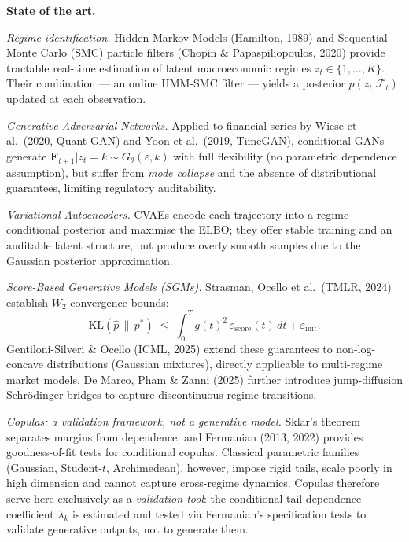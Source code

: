 \documentclass[11pt,a4paper]{article}
\begin{document}
\noindent\textbf{State of the art.}

\textit{Regime identification.}
Hidden Markov Models (Hamilton, 1989) and Sequential Monte Carlo (SMC) particle
filters (Chopin \& Papaspiliopoulos, 2020) provide tractable real-time estimation
of latent macroeconomic regimes $z_t \in \{1,\ldots,K\}$. Their combination ---
an online HMM-SMC filter --- yields a posterior $p(z_t|\mathcal{F}_t)$ updated at
each observation.

\textit{Generative Adversarial Networks.}
Applied to financial series by Wiese et al.\ (2020, Quant-GAN) and Yoon et al.\
(2019, TimeGAN), conditional GANs generate
$\mathbf{F}_{t+1} | z_t = k \sim G_\theta(\varepsilon,k)$ with full flexibility
(no parametric dependence assumption), but suffer from \textit{mode collapse}
and the absence of distributional guarantees, limiting regulatory auditability.

\textit{Variational Autoencoders.}
CVAEs encode each trajectory into a regime-conditional posterior and maximise
the ELBO; they offer stable training and an auditable latent structure, but
produce overly smooth samples due to the Gaussian posterior approximation.

\textit{Score-Based Generative Models (SGMs).}
Strasman, Ocello et al.\ (TMLR, 2024) establish $W_2$ convergence bounds:
\begin{equation}
  \mathrm{KL}(\hat{p}\,\|\,p^*)
  \;\le\; \int_0^T g(t)^2\,\varepsilon_{\mathrm{score}}(t)\,dt
  + \varepsilon_{\mathrm{init}}.
\label{eq:kl}
\end{equation}
Gentiloni-Silveri \& Ocello (ICML, 2025) extend these guarantees to
non-log-concave distributions (Gaussian mixtures), directly applicable to
multi-regime market models. De Marco, Pham \& Zanni (2025) further introduce
jump-diffusion Schr\"{o}dinger bridges to capture discontinuous regime
transitions.

\textit{Copulas: a validation framework, not a generative model.}
Sklar's theorem separates margins from dependence, and Fermanian (2013, 2022)
provides goodness-of-fit tests for conditional copulas. Classical parametric
families (Gaussian, Student-$t$, Archimedean), however, impose rigid tails,
scale poorly in high dimension and cannot capture cross-regime dynamics.
Copulas therefore serve here exclusively as a \emph{validation tool}: the
conditional tail-dependence coefficient $\lambda_k$ is estimated and tested
via Fermanian's specification tests to validate generative outputs, not to
generate them.
\end{document}
